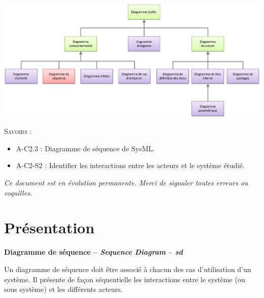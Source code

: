 \documentclass[10pt]{article}
\begin{document}





\begin{center}
\includegraphics[width=.95\textwidth]{images/seq} 
\end{center}

\vspace{.2cm}

%

\begin{savoir}
\textsc{Savoirs :}
\begin{itemize}
\item A-C2.3 : Diagramme de séquence de SysML.
\item A-C2-S2 : Identifier les interactions entre les acteurs et le système étudié. 
\end{itemize}
\end{savoir}

\setlength{\parskip}{0ex plus 0.2ex minus 0ex}
 \renewcommand{\contentsname}{}
 \renewcommand{\baselinestretch}{1}

\tableofcontents

 \renewcommand{\baselinestretch}{1.2}
\setlength{\parskip}{2ex plus 0.5ex minus 0.2ex}

\textit{Ce document est en évolution permanente. Merci de signaler toutes
erreurs ou coquilles.}

\section{Présentation}
\begin{defi}
\textbf{Diagramme de séquence -- \textit{Sequence Diagram} -- \textit{sd} }

Un diagramme de séquence doit être associé à chacun des cas d'utilisation d'un système. Il présente de façon séquentielle les interactions entre le système (ou sous système) et les différents acteurs. 
\end{defi}
\end{document}
